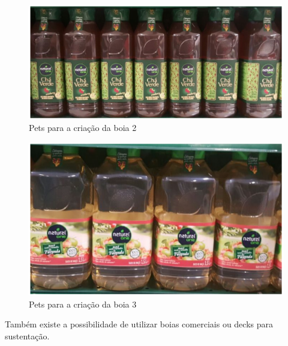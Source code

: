 \begin{figure}[H]
 \centering
   \includegraphics[keepaspectratio=true,scale=0.8]{figuras/garrafa_1.eps}
 \caption{Pets para a criação da boia 2}
 \label{pets1}
\end{figure}

\begin{figure}[H]
 \centering
   \includegraphics[keepaspectratio=true,scale=0.8]{figuras/garrafa_2.eps}
 \caption{Pets para a criação da boia 3}
 \label{pets2}
\end{figure}

Também existe a possibilidade de utilizar boias comerciais \cite{nauticexpo}  ou decks \cite{smartpier} para sustentação.

